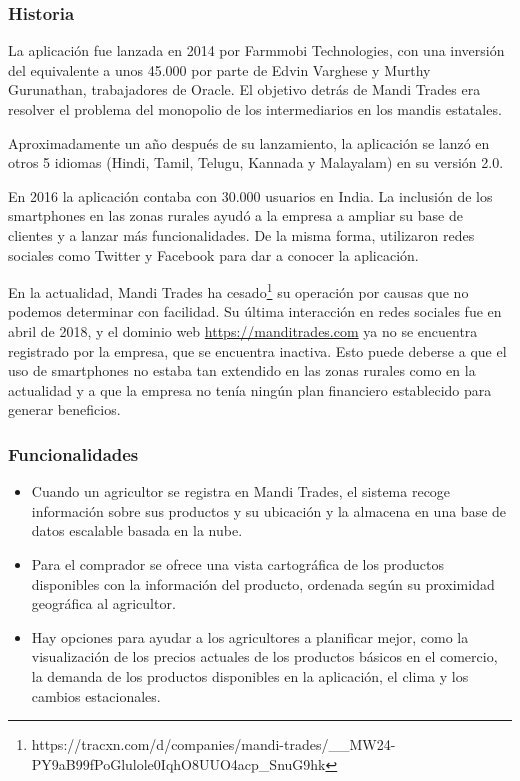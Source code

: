 \subsubsection{Historia}

La aplicación fue lanzada en 2014 por Farmmobi Technologies, con una inversión del equivalente a unos 45.000\geneuro{}  por parte de Edvin Varghese y Murthy Gurunathan, trabajadores de Oracle. El objetivo detrás de Mandi Trades era resolver el problema del monopolio de los intermediarios en los mandis estatales.

Aproximadamente un año después de su lanzamiento, la aplicación se lanzó en otros 5 idiomas (Hindi, Tamil, Telugu, Kannada y Malayalam) en su versión 2.0.

En 2016 la aplicación contaba con 30.000 usuarios en India. La inclusión de los smartphones en las zonas rurales ayudó a la empresa a ampliar su base de clientes y a lanzar más funcionalidades. De la misma forma, utilizaron redes sociales como Twitter y Facebook para dar a conocer la aplicación.

En la actualidad, Mandi Trades ha cesado\footnote{https://tracxn.com/d/companies/mandi-trades/\_\_MW24-PY9aB99fPoGlulole0IqhO8UUO4acp\_SnuG9hk} su operación por causas que no podemos determinar con facilidad. Su última interacción en redes sociales fue en abril de 2018, y el dominio web \url{https://manditrades.com} ya no se encuentra registrado por la empresa, que se encuentra inactiva. Esto puede deberse a que el uso de smartphones no estaba tan extendido en las zonas rurales como en la actualidad y a que la empresa no tenía ningún plan financiero establecido para generar beneficios.

\subsubsection{Funcionalidades}

\begin{itemize}

	\item Cuando un agricultor se registra en Mandi Trades, el sistema recoge información sobre sus productos y su ubicación y la almacena en una base de datos escalable basada en la nube.
	
	\item Para el comprador se ofrece una vista cartográfica de los productos disponibles con la información del producto, ordenada según su proximidad geográfica al agricultor.

	\item Hay opciones para ayudar a los agricultores a planificar mejor, como la visualización de los precios actuales de los productos básicos en el comercio, la demanda de los productos disponibles en la aplicación, el clima y los cambios estacionales.

\end{itemize}


